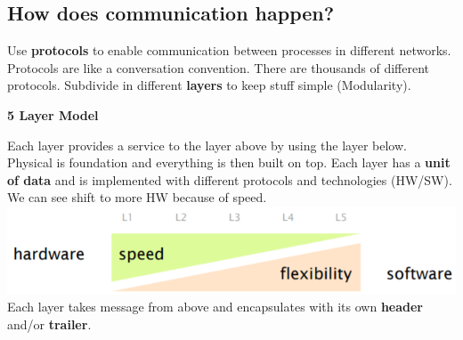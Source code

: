 \documentclass[a4paper, fontsize=8pt, landscape, DIV=1]{scrartcl}
\begin{document}
\begin{multicols*}{4}
				\subsection{How does communication happen?}
				Use \textbf{protocols} to enable communication between processes in different networks. Protocols are like a conversation convention. There are thousands of different protocols. Subdivide in different \textbf{layers} to keep stuff simple (Modularity).
				\begin{center}
					\textbf{5 Layer Model}\\
				\end{center}
				\par 
				Each layer provides a service to the layer above by using the layer below. Physical is foundation and everything is then built on top. 
				Each layer has a \textbf{unit of data} and is implemented with different protocols and technologies (HW/SW). We can see shift to more HW because of speed. 
				\includegraphics[width=\columnwidth]{images/Overview/hw_sw.png}
				Each layer takes message from above and encapsulates with its own \textbf{header} and/or \textbf{trailer}. 

\end{multicols*}
\end{document}

